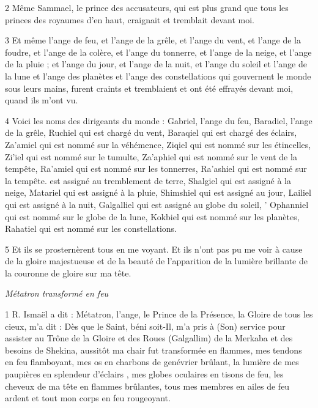\par 2 Même Sammael, le prince des accusateurs, qui est plus grand que tous les princes des royaumes d'en haut, craignait et tremblait devant moi.

\par 3 Et même l'ange de feu, et l'ange de la grêle, et l'ange du vent, et l'ange de la foudre, et l'ange de la colère, et l'ange du tonnerre, et l'ange de la neige, et l'ange de la pluie ; et l'ange du jour, et l'ange de la nuit, et l'ange du soleil et l'ange de la lune et l'ange des planètes et l'ange des constellations qui gouvernent le monde sous leurs mains, furent craints et tremblaient et ont été effrayés devant moi, quand ils m'ont vu.

\par 4 Voici les noms des dirigeants du monde : Gabriel, l'ange du feu, Baradiel, l'ange de la grêle, Ruchiel qui est chargé du vent, Baraqiel qui est chargé des éclairs, Za'amiel qui est nommé sur la véhémence, Ziqiel qui est nommé sur les étincelles, Zi'iel qui est nommé sur le tumulte, Za'aphiel qui est nommé sur le vent de la tempête, Ra'amiel qui est nommé sur les tonnerres, Ra'ashiel qui est nommé sur la tempête. est assigné au tremblement de terre, Shalgiel qui est assigné à la neige, Matariel qui est assigné à la pluie, Shimshiel qui est assigné au jour, Lailiel qui est assigné à la nuit, Galgalliel qui est assigné au globe du soleil, ' Ophanniel qui est nommé sur le globe de la lune, Kokbiel qui est nommé sur les planètes, Rahatiel qui est nommé sur les constellations.

\par 5 Et ils se prosternèrent tous en me voyant. Et ils n’ont pas pu me voir à cause de la gloire majestueuse et de la beauté de l’apparition de la lumière brillante de la couronne de gloire sur ma tête.


\par \textit{Métatron transformé en feu}

\par 1 R. Ismaël a dit : Métatron, l'ange, le Prince de la Présence, la Gloire de tous les cieux, m'a dit : Dès que le Saint, béni soit-Il, m'a pris à (Son) service pour assister au Trône de la Gloire et des Roues (Galgallim) de la Merkaba et des besoins de Shekina, aussitôt ma chair fut transformée en flammes, mes tendons en feu flamboyant, mes os en charbons de genévrier brûlant, la lumière de mes paupières en splendeur d'éclairs , mes globes oculaires en tisons de feu, les cheveux de ma tête en flammes brûlantes, tous mes membres en ailes de feu ardent et tout mon corps en feu rougeoyant.

